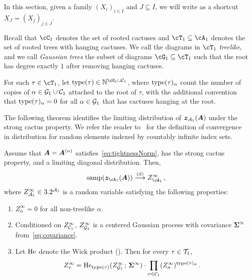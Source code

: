In this section, given a family $(X_i)_{i\in I}$ and
$J\subseteq I$, we will write as a shortcut $X_J = (X_j)_{j\in J}$. 

Recall that $\cC_1$ denotes the set of rooted cactuses and $\cT_1 \subseteq \cA_1$ denotes the set of rooted trees with hanging cactuses.
We call the diagrams in $\cT_1$ \emph{treelike}, and we call \emph{Gaussian trees} the subset of diagrams $\cG_1 \subseteq \cT_1$ such that the root has degree exactly $1$ after removing hanging cactuses.

\begin{definition}[Type]
    For each $\tau\in\cT_1$, let
    $\type(\tau) \in \N^{\cG_1\cup \calC_1}$, where $\operatorname{type}(\tau)_\alpha$ count the
    number of copies of $\alpha\in {\cal G}_1\cup {\cal C}_1$ attached to the root of $\tau$,
    with the additional convention that
    $\operatorname{type}(\tau)_\alpha=0$ for all
    $\alpha\in{\cal G}_1$ that has cactuses hanging at the root.
\end{definition}

The following theorem identifies the limiting distribution of ${\bm z}_{{\cal A}_1}({\bm A})$ under the strong cactus property.
We refer the reader to~ for the definition of convergence in distribution for random elements indexed by countably infinite index sets.

\begin{theorem}
\label{thm:convergence-distribution}
    Assume that ${\bm A}={\bm A}^{(n)}$ satisfies~\cref{eq:tightnessNorm}, has the strong cactus property, and a limiting diagonal distribution.
    Then,
    \[
        \samp(\bmz_{\cA_1}(\bA)) \tod Z_{\cA_1}^{\infty}\,,
    \]
    where $Z_{{\cal A}_1}^{\infty} \in 3.2^{{\cal A}_1}$ is a random variable satisfying the following properties:
    \begin{enumerate}
        \item $Z_{\alpha}^\infty = 0$ for all non-treelike $\alpha$.

        \item Conditioned on $Z^\infty_{{\cal C}_1}$, $Z^\infty_{{\cal G}_1}$ is a centered
        Gaussian process with covariance $\bm \Sigma^\infty$ from~\cref{eq:covariance}.
        
        \item Let $\operatorname{He}$ denote the Wick product (). Then
        for every $\tau\in{\cal T}_1$,
        \[
            Z^\infty_\tau
            = \operatorname{He}_{\operatorname{type}(\tau)}(Z^\infty_{{\cal G}_1}\,;\,\bm \Sigma^\infty)\cdot \prod_{\sigma\in {\cal C}_1} (Z^\infty_{\sigma})^{\operatorname{type}(\tau)_\sigma}\,.
        \]
    \end{enumerate}
\end{theorem}

